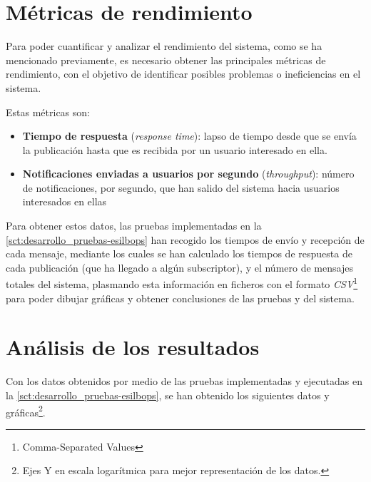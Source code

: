 
\section{Métricas de rendimiento} \label{sct:desarrollo_metricas}

Para poder cuantificar y analizar el rendimiento del sistema, como se ha mencionado previamente, 
es necesario obtener las principales métricas de rendimiento, con el objetivo de identificar posibles 
problemas o ineficiencias en el sistema.

Estas métricas son:
\begin{itemize}

    \item \textbf{Tiempo de respuesta} (\textit{response time}): lapso de tiempo
    desde que se envía la publicación hasta que es recibida por un usuario 
    interesado en ella.

    \item \textbf{Notificaciones enviadas a usuarios por segundo}
    (\textit{throughput}): número de notificaciones, por segundo, que han salido
    del sistema hacia usuarios interesados en ellas

\end{itemize}

Para obtener estos datos, las pruebas implementadas en la 
\autoref{sct:desarrollo_pruebas-esilbops} han recogido los tiempos de envío y 
recepción de cada mensaje, mediante los cuales se han calculado los tiempos de 
respuesta de cada publicación (que ha llegado a algún subscriptor), y el número
de mensajes totales del sistema, plasmando esta información en ficheros con el 
formato \textit{CSV}\footnote{Comma-Separated Values} para poder dibujar 
gráficas y obtener conclusiones de las pruebas y del sistema.


\section{Análisis de los resultados} \label{sct:desarrollo_resultados}

Con los datos obtenidos por medio de las pruebas implementadas y ejecutadas en la 
\autoref{sct:desarrollo_pruebas-esilbops}, se han obtenido los siguientes datos y 
gráficas\footnote{Ejes Y en escala logarítmica para mejor representación de los datos.}.

